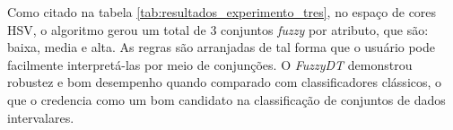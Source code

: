 Como citado na tabela \ref{tab:resultados_experimento_tres}, no espaço de cores HSV, o algoritmo gerou um total de 3 conjuntos \emph{fuzzy} por atributo, que são: baixa, media e alta. As regras são arranjadas de tal forma que o usuário pode facilmente interpretá-las por meio de conjunções. O \emph{FuzzyDT} demonstrou robustez e bom desempenho quando comparado com classificadores clássicos, o que o credencia como um bom candidato na classificação de conjuntos de dados intervalares.